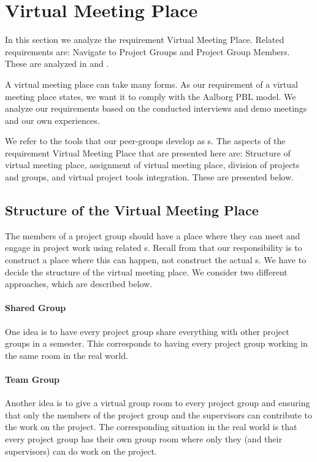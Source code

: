 \section{Virtual Meeting Place}
\label{sec:virtualMeetingPlace}
\label{sec:projectgroup}
In this section we analyze the requirement Virtual Meeting Place.
Related requirements are: Navigate to Project Groups and Project Group Members.
These are analyzed in  and .

A virtual meeting place can take many forms.
As our requirement of a virtual meeting place states, we want it to comply with the Aalborg PBL model.
We analyze our requirements based on the conducted interviews and demo meetings and our own experiences.

We refer to the tools that our peer-groups develop as \detdeandrelaver{}s.
The aspects of the requirement Virtual Meeting Place that are presented here are: Structure of virtual meeting place, assignment of virtual meeting place, division of projects and groups, and virtual project tools integration.
These are presented below.


\subsection{Structure of the Virtual Meeting Place}
The members of a project group should have a place where they can meet and engage in project work using related \detdeandrelaver[]s.
Recall from  that our responsibility is to construct a place where this can happen, not construct the actual \detdeandrelaver[]s.
We have to decide the structure of the virtual meeting place.
We consider two different approaches, which are described below.


\paragraph{Shared Group} One idea is to have every project group share everything with other project groups in a semester.
This corresponds to having every project group working in the same room in the real world.

\paragraph{Team Group} Another idea is to give a virtual group room to every project group and ensuring that only the members of the project group and the supervisors can contribute to the work on the project.
The corresponding situation in the real world is that every project group has their own group room where only they (and their supervisors) can do work on the project. \\

